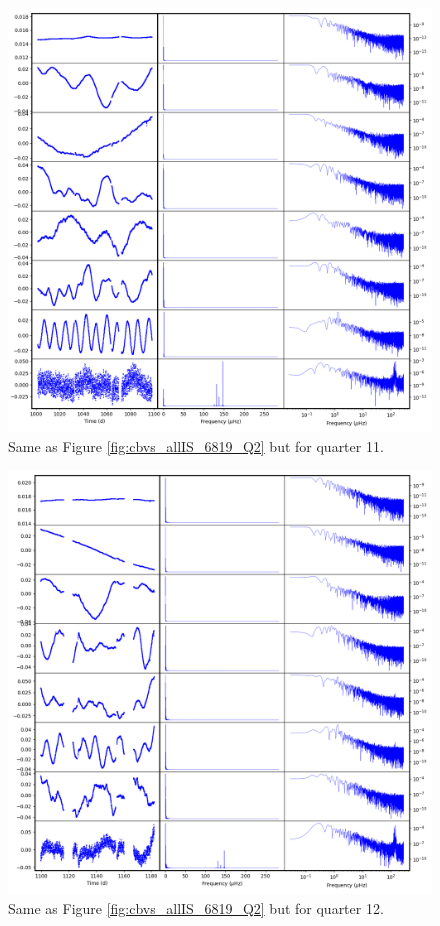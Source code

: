 \begin{figure}
    \centering
    \includegraphics[width=\linewidth]{Chapter_Appended/AppB/cbv_6819_q11.png}
    \caption{Same as Figure \ref{fig:cbvs_allIS_6819_Q2} but for quarter 11.}
    \label{fig:cbvs_allIS_6819_Q11}
\end{figure}


\begin{figure}
    \centering
    \includegraphics[width=\linewidth]{Chapter_Appended/AppB/cbv_6819_q12.png}
    \caption{Same as Figure \ref{fig:cbvs_allIS_6819_Q2} but for quarter 12.}
    \label{fig:cbvs_allIS_6819_Q12}
\end{figure}


